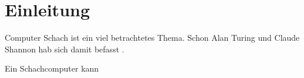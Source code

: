 \chapter{Einleitung}

Computer Schach ist ein viel betrachtetes Thema. Schon Alan Turing und Claude Shannon hab sich damit befasst \cite{Turing1953, Shannon1950}.


Ein Schachcomputer kann